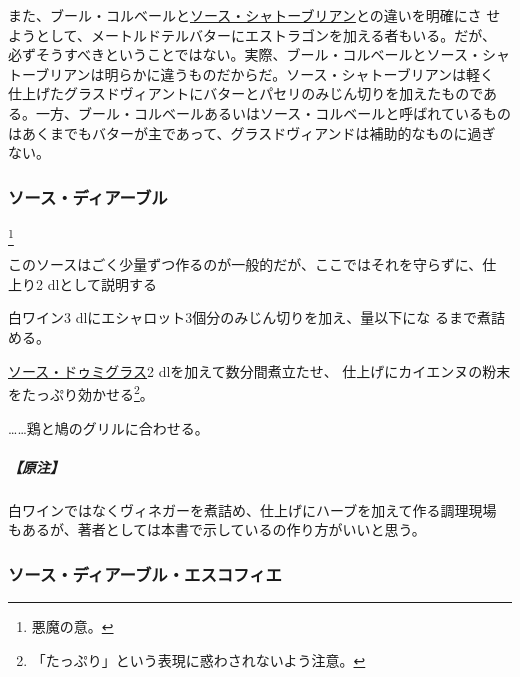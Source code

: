\begin{recette}
また、ブール・コルベールと\protect\hyperlink{sauce-chateaubriand}{ソース・シャトーブリアン}との違いを明確にさ
せようとして、メートルドテルバターにエストラゴンを加える者もいる。だが、
必ずそうすべきということではない。実際、ブール・コルベールとソース・シャ
トーブリアンは明らかに違うものだからだ。ソース・シャトーブリアンは軽く
仕上げたグラスドヴィアントにバターとパセリのみじん切りを加えたものであ
る。一方、ブール・コルベールあるいはソース・コルベールと呼ばれているもの
はあくまでもバターが主であって、グラスドヴィアンドは補助的なものに過ぎ
ない。

\hypertarget{sauce-diable}{%
\subsubsection{ソース・ディアーブル}\label{sauce-diable}}

\footnote{悪魔の意。}


このソースはごく少量ずつ作るのが一般的だが、ここではそれを守らずに、仕
上り2\undemi{} dlとして説明する

白ワイン3 dlにエシャロット3個分のみじん切りを加え、\untiers{}量以下にな
るまで煮詰める。

\protect\hyperlink{sauce-demi-glace}{ソース・ドゥミグラス}2
dlを加えて数分間煮立たせ、
仕上げにカイエンヌの粉末をたっぷり効かせる\footnote{「たっぷり」という表現に惑わされないよう注意。}。

\ldots{}\ldots{}鶏と鳩のグリルに合わせる。

\hypertarget{nota-sauce-diable}{%
\subparagraph{【原注】}\label{nota-sauce-diable}}

白ワインではなくヴィネガーを煮詰め、仕上げにハーブを加えて作る調理現場
もあるが、著者としては本書で示しているの作り方がいいと思う。

\hypertarget{sauce-diable-escoffier}{%
\subsubsection{ソース・ディアーブル・エスコフィエ}\label{sauce-diable-escoffier}}


\end{recette}
